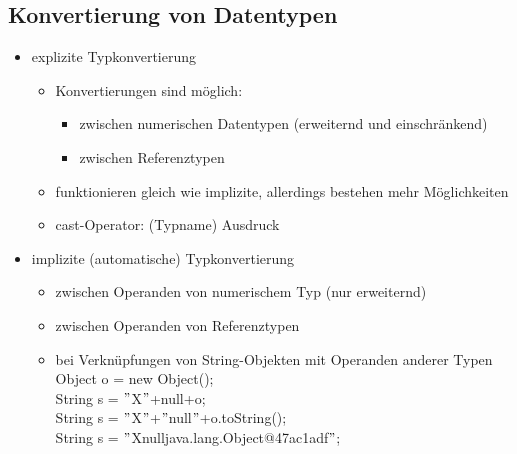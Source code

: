 \documentclass[a4paper,10pt]{article}
\begin{document}
\subsection{Konvertierung von Datentypen}
\begin{itemize}
	\item explizite Typkonvertierung
		\begin{itemize}
			\item Konvertierungen sind m\"oglich:
				\begin{itemize}
					\item zwischen numerischen Datentypen (erweiternd und einschr\"ankend)
					\item zwischen Referenztypen
				\end{itemize}
			\item funktionieren gleich wie implizite, allerdings bestehen mehr M\"oglichkeiten
			\item cast-Operator: (Typname) Ausdruck
		\end{itemize}
	\item implizite (automatische) Typkonvertierung
		\begin{itemize}
			\item zwischen Operanden von numerischem Typ (nur erweiternd)
			\item zwischen Operanden von Referenztypen
			\item bei Verkn\"upfungen von String-Objekten mit Operanden anderer Typen \\
			    Object o = new Object();\\
			    String s = $"$X$"$+null+o;\\
			   String s = $"$X$"$+$"$null$"$+o.toString();\\
                                   String s = $"$Xnulljava.lang.Object@47ac1adf$"$;
		\end{itemize}
\end{itemize}
\end{document}
